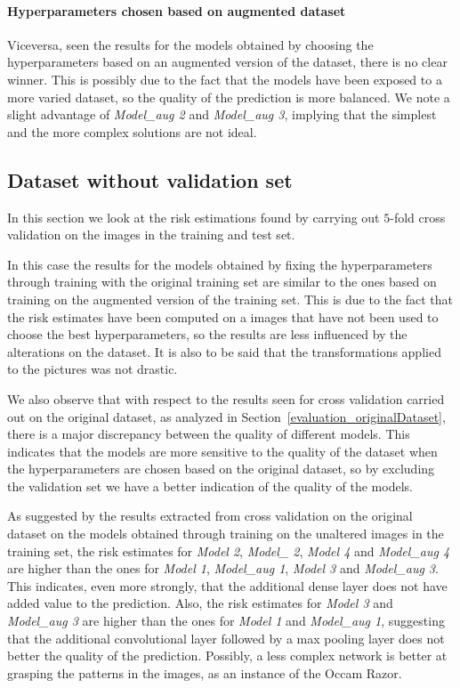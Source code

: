 \paragraph{Hyperparameters chosen based on augmented dataset}
Viceversa, seen the results for the models obtained by choosing the hyperparameters based on an augmented version of the dataset, there is no clear winner. This is possibly due to the fact that the models have been exposed to a more varied dataset, so the quality of the prediction is more balanced. We note a slight advantage of \textsl{Model\_aug 2} and \textsl{Model\_aug 3}, implying that the simplest and the more complex solutions are not ideal.

\subsection{Dataset without validation set}\label{evaluation_datasetWithoutVal}
In this section we look at the risk estimations found by carrying out $5$-fold cross validation on the images in the training and test set.

In this case the results for the models obtained by fixing the hyperparameters through training with the original training set are similar to the ones based on training on the augmented version of the training set. This is due to the fact that the risk estimates have been computed on a images that have not been used to choose the best hyperparameters, so the results are less influenced by the alterations on the dataset. It is also to be said that the transformations applied to the pictures was not drastic.

We also observe that with respect to the results seen for cross validation carried out on the original dataset, as analyzed in Section~\ref{evaluation_originalDataset}, there is a major discrepancy between the quality of different models. This indicates that the models are more sensitive to the quality of the dataset when the hyperparameters are chosen based on the original dataset, so by excluding the validation set we have a better indication of the quality of the models.

As suggested by the results extracted from cross validation on the original dataset on the models obtained through training on the unaltered images in the training set, the risk estimates for \textsl{Model 2}, \textsl{Model\_ 2}, \textsl{Model 4} and \textsl{Model\_aug 4} are higher than the ones for \textsl{Model 1}, \textsl{Model\_aug 1}, \textsl{Model 3} and \textsl{Model\_aug 3}. This indicates, even more strongly, that the additional dense layer does not have added value to the prediction. Also, the risk estimates for \textsl{Model 3} and \textsl{Model\_aug 3} are higher than the ones for \textsl{Model 1} and \textsl{Model\_aug 1}, suggesting that the additional convolutional layer followed by a max pooling layer does not better the quality of the prediction. Possibly, a less complex network is better at grasping the patterns in the images, as an instance of the Occam Razor.
